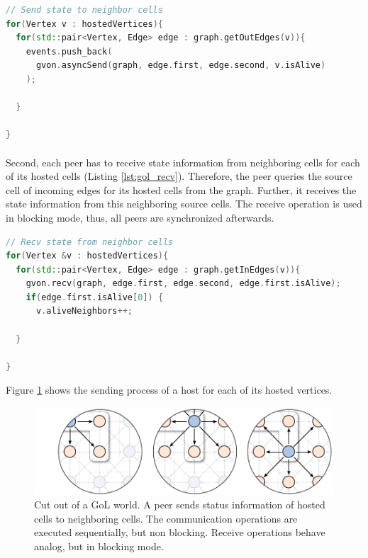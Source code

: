 \begin{lstlisting}[language=C++, label=lst:gol_send, caption={\ }]
// Send state to neighbor cells
for(Vertex v : hostedVertices){
  for(std::pair<Vertex, Edge> edge : graph.getOutEdges(v)){
    events.push_back(
      gvon.asyncSend(graph, edge.first, edge.second, v.isAlive)
    );

  }

}
\end{lstlisting}

\paragraph*{}
Second, each peer has to receive state information from neighboring
cells for each of its hosted cells (Listing
\ref{lst:gol_recv}). Therefore, the peer queries the source cell of
incoming edges for its hosted cells from the graph. Further, it
receives the state information from this neighboring source cells.
The receive operation is used in blocking mode, thus, all peers are
synchronized afterwards.

\begin{lstlisting}[language=C++, label=lst:gol_recv, caption={\ }]
// Recv state from neighbor cells
for(Vertex &v : hostedVertices){
  for(std::pair<Vertex, Edge> edge : graph.getInEdges(v)){
    gvon.recv(graph, edge.first, edge.second, edge.first.isAlive);
    if(edge.first.isAlive[0]) { 
      v.aliveNeighbors++;

  }

}
\end{lstlisting}

Figure \ref{fig:gol_communication} shows the sending process of a host
for each of its hosted vertices.

\begin{figure}[H]
  \centering
  \includegraphics[width=\textwidth]{graphics/40_gol_communication}
  \caption{Cut out of a GoL world. A peer sends status information of
    hosted cells to neighboring cells. The communication operations
    are executed sequentially, but non blocking. Receive operations
    behave analog, but in blocking mode.}
  \label{fig:gol_communication}
\end{figure}

